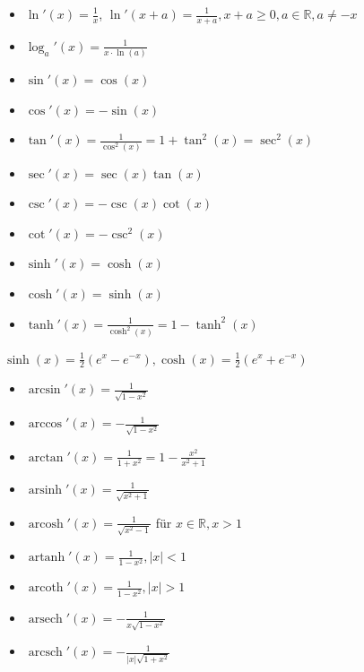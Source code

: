 \begin{itemize}
    \item $\ln'(x)= \frac{1}{x}$, $\ln'(x+a) = \frac{1}{x+a}, x+a \geq 0, a \in \mathbb{R}, a \neq -x$
    \item $\log_a'(x) = \frac{1}{x \cdot \ln(a)}$
\end{itemize}

\begin{itemize}
    \item $\sin'(x)= \cos(x)$
    \item $\cos'(x)=-\sin(x)$
    \item $\tan'(x) = \frac{1}{\cos ^2 (x)}= 1 + \tan ^2(x) = \sec^2(x)$
\end{itemize}

\begin{itemize}
    \item $\sec'(x)= \sec(x)\tan(x)$
    \item $\csc'(x)=-\csc(x)\cot(x)$
    \item $\cot'(x) = -\csc^2(x)$
\end{itemize}

\begin{itemize}
    \item $\sinh'(x)= \cosh(x)$
    \item $\cosh'(x)= \sinh(x)$
    \item $\tanh'(x)=\frac{1}{\cosh^2(x)} = 1 - \tanh^2(x)$
\end{itemize}
$\sinh (x) = \frac{1}{2} (e^x  - e^{-x}), \cosh (x) = \frac{1}{2}(e^x + e^{-x})$


\begin{itemize}
    \item $\arcsin'(x)=\frac{1}{\sqrt{1-x^2}}$
    \item $\arccos'(x)=-\frac{1}{\sqrt{1-x^2}}$
    \item $\arctan'(x)=\frac{1}{1+x^2}=1-\frac{x^2}{x^2 + 1}$
    \item $\operatorname{arsinh}'(x)=\frac{1}{\sqrt{x^2 + 1}}$
    \item $\operatorname{arcosh}'(x)=\frac{1}{\sqrt{x^2 - 1}}$ für $x \in \mathbb{R}, x>1$
    \item $\operatorname{artanh}'(x)=\frac{1}{1-x^2}, |x|<1$
    \item $\operatorname{arcoth}'(x)=\frac{1}{1-x^2}, |x|>1$
    \item $\operatorname{arsech}'(x)=-\frac{1}{x\sqrt{1-x^2}}$
    \item $\operatorname{arcsch}'(x)=-\frac{1}{|x|\sqrt{1+x^2}}$
\end{itemize}

